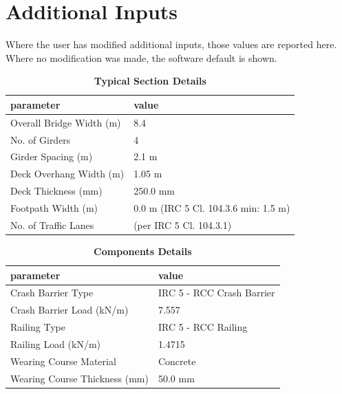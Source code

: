 \documentclass[12pt,a4paper]{report}
\numberwithin{table}{chapter}
\numberwithin{figure}{chapter}
\begin{document}
\newpage
\section{Additional Inputs}
\label{sec:additional-inputs}

Where the user has modified additional inputs, those values are reported here. Where no modification was made, the software default is shown.

\vspace{0.8cm}

\begin{longtable}{|L{5.5cm}|p{10.0cm}|}
\caption{\textbf{Typical Section Details}}
\hline
\textbf{parameter} & \textbf{value} \\
\hline
\textnormal{Overall Bridge Width (m)} & 8.4 \\[6pt]
\hline
\textnormal{No. of Girders} & 4 \\[6pt]
\hline
\textnormal{Girder Spacing (m)} & 2.1 m \\[6pt]
\hline
\textnormal{Deck Overhang Width (m)} & 1.05 m \\[6pt]
\hline
\textnormal{Deck Thickness (mm)} & 250.0 mm \\[6pt]
\hline
\textnormal{Footpath Width (m)} & 0.0 m (IRC 5 Cl. 104.3.6 min: 1.5 m) \\[6pt]
\hline
\textnormal{No. of Traffic Lanes} &  (per IRC 5 Cl. 104.3.1) \\[6pt]
\hline
\end{longtable}

\vspace{0.8em}

\begin{longtable}{|L{5.5cm}|p{10.0cm}|}
\caption{\textbf{Components Details}}
\hline
\textbf{parameter} & \textbf{value} \\
\hline
\textnormal{Crash Barrier Type} & IRC 5 - RCC Crash Barrier \\[6pt]
\hline
\textnormal{Crash Barrier Load (kN/m)} & 7.557 \\[6pt]
\hline

\textnormal{Railing Type} & IRC 5 - RCC Railing \\[6pt]
\hline
\textnormal{Railing Load (kN/m)} & 1.4715 \\[6pt]
\hline
\textnormal{Wearing Course Material} & Concrete \\[6pt]
\hline
\textnormal{Wearing Course Thickness (mm)} & 50.0 mm \\[6pt]
\hline
\end{longtable}
\end{document}
